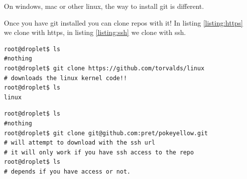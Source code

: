 \documentclass[12pt]{article}
\begin{document}
On windows, mac or other linux, the way to install git is different.

Once you have git installed you can clone repos with it! In listing \ref{listing:https} we clone with https, in listing \ref{listing:ssh} we clone with ssh.


\begin{lstlisting}[style=term, caption=clone with https,label=listing:https]
root@droplet$ ls
#nothing
root@droplet$ git clone https://github.com/torvalds/linux
# downloads the linux kernel code!!
root@droplet$ ls
linux
\end{lstlisting}

\begin{lstlisting}[style=term, caption=clone with ssh, label=listing:ssh]
root@droplet$ ls
#nothing
root@droplet$ git clone git@github.com:pret/pokeyellow.git
# will attempt to download with the ssh url
# it will only work if you have ssh access to the repo
root@droplet$ ls
# depends if you have access or not.
\end{lstlisting}
\end{document}
